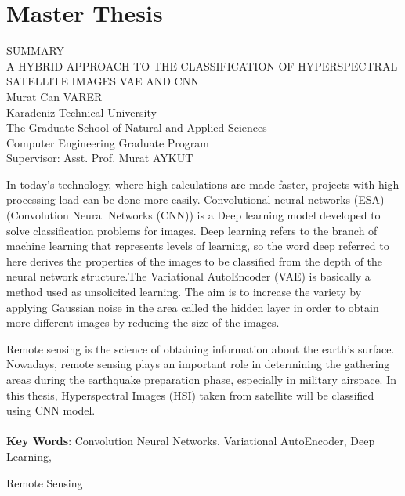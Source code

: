 \chapter*{ \normalfont Master Thesis}

\begin{center}
    \vspace{-1.25cm}
    SUMMARY\\
    \vspace{0.33cm}
    A HYBRID APPROACH TO THE CLASSIFICATION OF HYPERSPECTRAL SATELLITE IMAGES VAE AND CNN \\
    \vspace{0.33cm}
    Murat Can VARER\\
    \vspace{0.33cm}
    Karadeniz Technical University\\
    The Graduate School of Natural and Applied Sciences\\
    Computer Engineering Graduate Program\\ 
    Supervisor: Asst. Prof. Murat AYKUT
\end{center}
\vspace{0.5cm}
\hspace{0.8cm} In today's technology, where high calculations are made faster, projects with high processing load can be done more easily. Convolutional neural networks (ESA) (Convolution Neural Networks (CNN)) is a Deep learning model developed to solve classification problems for images.
Deep learning refers to the branch of machine learning that represents levels of learning, so the word deep referred to here derives the properties of the images to be classified from the depth of the neural network structure.The Variational AutoEncoder (VAE) is basically a method used as unsolicited learning. The aim is to increase the variety by applying Gaussian noise in the area called the hidden layer in order to obtain more different images by reducing the size of the images.

Remote sensing is the science of obtaining information about the earth's surface. Nowadays, remote sensing plays an important role in determining the gathering areas during the earthquake preparation phase, especially in military airspace. In this thesis, Hyperspectral Images (HSI) taken from satellite will be classified using CNN model.
\\
\\
\textbf{Key Words}: Convolution Neural Networks, Variational AutoEncoder, Deep Learning,


                    \hspace{1.12cm} Remote Sensing

